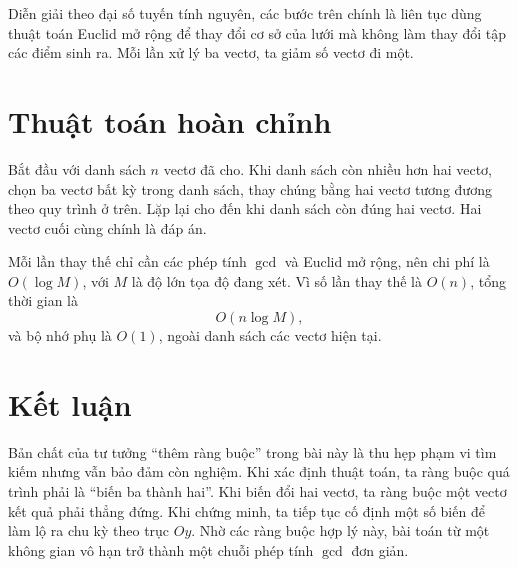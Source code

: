 \documentclass[11pt]{article}
\begin{document}
Diễn giải theo đại số tuyến tính nguyên, các bước trên chính là liên tục dùng
thuật toán Euclid mở rộng để thay đổi cơ sở của lưới mà không làm thay đổi tập
các điểm sinh ra. Mỗi lần xử lý ba vectơ, ta giảm số vectơ đi một.

\section{Thuật toán hoàn chỉnh}

Bắt đầu với danh sách \(n\) vectơ đã cho. Khi danh sách còn nhiều hơn hai
vectơ, chọn ba vectơ bất kỳ trong danh sách, thay chúng bằng hai vectơ tương
đương theo quy trình ở trên. Lặp lại cho đến khi danh sách còn đúng hai vectơ.
Hai vectơ cuối cùng chính là đáp án.

Mỗi lần thay thế chỉ cần các phép tính \(\gcd\) và Euclid mở rộng, nên chi phí
là \(O(\log M)\), với \(M\) là độ lớn tọa độ đang xét. Vì số lần thay thế là
\(O(n)\), tổng thời gian là
\[
  O(n\log M),
\]
và bộ nhớ phụ là \(O(1)\), ngoài danh sách các vectơ hiện tại.

\section{Kết luận}

Bản chất của tư tưởng ``thêm ràng buộc'' trong bài này là thu hẹp phạm vi tìm
kiếm nhưng vẫn bảo đảm còn nghiệm. Khi xác định thuật toán, ta ràng buộc quá
trình phải là ``biến ba thành hai''. Khi biến đổi hai vectơ, ta ràng buộc một
vectơ kết quả phải thẳng đứng. Khi chứng minh, ta tiếp tục cố định một số biến
để làm lộ ra chu kỳ theo trục \(Oy\). Nhờ các ràng buộc hợp lý này, bài toán
từ một không gian vô hạn trở thành một chuỗi phép tính \(\gcd\) đơn giản.
\end{document}
